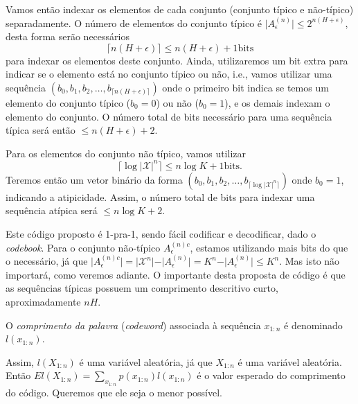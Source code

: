 Vamos então indexar os elementos de cada conjunto (conjunto típico e não-típico) separadamente.
O número de elementos do conjunto típico é $\vert A_\epsilon^{(n)} \vert \leq 2^{n(H+\epsilon)}$,
desta forma serão necessários
\begin{equation}
  \lceil n(H+\epsilon) \rceil \leq n (H + \epsilon) + 1 \text{bits}
\end{equation}
para indexar os elementos deste conjunto.
Ainda, utilizaremos um bit extra para indicar se o elemento está no conjunto típico ou não, i.e.,
vamos utilizar uma sequência $(b_0,b_1,b_2,\ldots,b_{\lceil n(H+\epsilon) \rceil})$ onde
o primeiro bit indica se temos um elemento do conjunto típico ($b_0=0$) ou não ($b_0=1$),
e os demais indexam o elemento do conjunto.
O número total de bits necessário para uma sequência típica será então $\leq n(H+\epsilon)+2$.

Para os elementos do conjunto não típico, vamos utilizar
\begin{equation}
  \lceil \log \vert \mathcal{X} \vert^n \rceil \leq n \log K + 1 \text{bits}.
\end{equation}
Teremos então um vetor binário da forma $(b_0,b_1,b_2,\ldots,b_{\lceil \log \vert \mathcal{X} \vert^n \rceil})$
onde $b_0=1$, indicando a atipicidade.
Assim, o número total de bits para indexar uma sequência atípica será $\leq n \log K + 2$.

Este código proposto é 1-pra-1, sendo fácil codificar e decodificar, dado o \textit{codebook}.
Para o conjunto não-típico $A_\epsilon^{(n)c}$, estamos utilizando mais bits do que o necessário,
já que $\vert A_\epsilon^{(n)c} \vert = \vert \mathcal{X}^n \vert - \vert A_\epsilon^{(n)} \vert = K^n - \vert A_\epsilon^{(n)} \vert \leq K^n$.
Mas isto não importará, como veremos adiante.
O importante desta proposta de código é que as sequências típicas possuem um comprimento descritivo curto, aproximadamente $nH$.

\begin{definition}
  O \emph{comprimento da palavra} (\emph{codeword}) associada à sequência $x_{1:n}$ é denominado $l(x_{1:n})$.
\end{definition}
Assim, $l(X_{1:n})$ é uma variável aleatória, já que $X_{1:n}$ é uma variável aleatória.
Então $E l(X_{1:n}) = \sum_{x_{1:n}} p(x_{1:n}) l(x_{1:n})$ é o valor esperado do comprimento
do código. Queremos que ele seja o menor possível.

